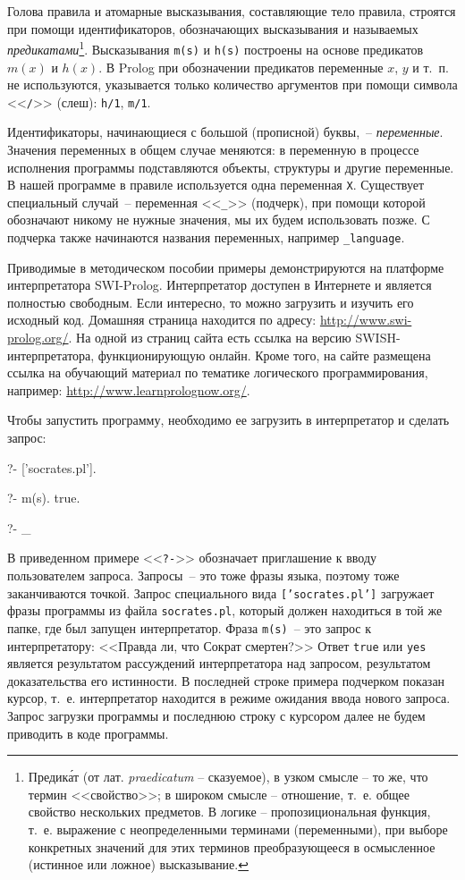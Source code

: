 \documentclass[a4paper,14pt, openany, twoside, draft]{extbook} %
\begin{document}
Голова правила и атомарные высказывания, составляющие тело правила, строятся при помощи идентификаторов, обозначающих высказывания и называемых \emph{предикатами}\footnote{Предик\'{а}т (от лат. \emph{praedicatum} -- сказуемое), в узком смысле -- то же, что термин <<свойство>>; в широком смысле -- отношение, т.~е. общее свойство нескольких предметов. В логике -- пропозициональная функция, т.~е. выражение с неопределенными терминами (переменными), при выборе конкретных значений для этих терминов преобразующееся в осмысленное (истинное или ложное) высказывание.}.  Высказывания \texttt{m(s)} и \texttt{h(s)} построены на основе предикатов $m(x)$ и $h(x)$.  В Prolog при обозначении предикатов переменные $x$, $y$ и т.~п. не используются, указывается только количество аргументов при помощи символа <<\texttt{/}>> (слеш): \texttt{h/1}, \texttt{m/1}.

Идентификаторы, начинающиеся с большой (прописной) буквы,~-- \emph{переменные}.  Значения переменных в общем случае меняются: в переменную в процессе исполнения программы подставляются объекты, структуры и другие переменные.  В нашей программе в правиле используется одна переменная \texttt{X}.  Существует специальный случай~-- переменная <<\texttt{\_}>> (подчерк), при помощи которой обозначают никому не нужные значения, мы их будем использовать позже.  С подчерка также начинаются названия переменных, например \texttt{\_language}.

Приводимые в методическом пособии примеры демонстрируются на платформе интерпретатора SWI-Prolog.  Интерпретатор доступен в Интернете и является полностью свободным.  Если интересно, то можно загрузить и изучить его исходный код.  Домашняя страница находится по адресу: \url{http://www.swi-prolog.org/}.  На одной из страниц сайта есть ссылка на версию SWISH-интерпретатора, функционирующую онлайн.  Кроме того, на сайте размещена ссылка на обучающий материал по тематике логического программирования, например: \url{http://www.learnprolognow.org/}.

Чтобы запустить программу, необходимо ее загрузить в интерпретатор и сделать запрос:

\begin{proexp}
?- ['socrates.pl'].    %

?- m(s).               %
true.

?- _
\end{proexp}

  В приведенном примере <<\texttt{?-}>> обозначает приглашение к вводу пользователем запроса.  Запросы~-- это тоже фразы языка, поэтому тоже заканчиваются точкой.  Запрос специального вида \texttt{['socrates.pl']} загружает фразы программы из файла \texttt{socrates.pl}, который должен находиться в той же папке, где был запущен интерпретатор.  Фраза \texttt{m(s)}~-- это запрос к интерпретатору: <<Правда ли, что Сократ смертен?>>  Ответ \texttt{true} или \texttt{yes} является результатом рассуждений интерпретатора над запросом, результатом доказательства его истинности.  В последней строке примера подчерком показан курсор, т.~е. интерпретатор находится в режиме ожидания ввода нового запроса.  Запрос загрузки программы и последнюю строку с курсором далее не будем приводить в коде программы.
\end{document}
